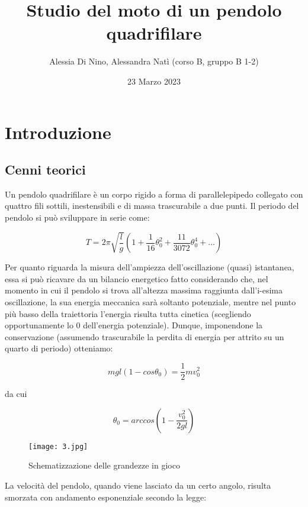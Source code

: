 \documentclass{article}
\begin{document}
\title{Studio del moto di un pendolo quadrifilare}
\author{Alessia Di Nino, Alessandra Natì (corso B, gruppo B 1-2)}
\date{23 Marzo 2023}
\maketitle


\section{Introduzione}
\subsection{Cenni teorici}
Un pendolo quadrifilare è un corpo rigido a forma di parallelepipedo collegato con quattro fili sottili, inestensibili e di massa trascurabile a due punti.
Il periodo del pendolo si può sviluppare in serie come:

\begin{equation}
    T = 2\pi \sqrt{\frac{l}{g}} (1 + \frac{1}{16}\theta_0^2 + \frac{11}{3072}\theta_0^4 + ...)
\end{equation}

Per quanto riguarda la misura dell'ampiezza dell'oscillazione (quasi) istantanea, essa si può ricavare da un bilancio energetico fatto considerando che, nel momento in cui il pendolo si trova all'altezza massima raggiunta dall'i-esima oscillazione, la sua energia meccanica sarà soltanto potenziale, mentre nel punto più basso della traiettoria l'energia risulta tutta cinetica (scegliendo opportunamente lo 0 dell'energia potenziale). Dunque, imponendone la conservazione (assumendo trascurabile la perdita di energia per attrito su un quarto di periodo) otteniamo:

\begin{equation*}
    mgl(1 - cos\theta_0)=\frac{1}{2}mv_0^2
\end{equation*}

da cui

\begin{equation}
    \theta_0 = arccos(1-\frac{v_0^2}{2gl})
    \label{theta}
\end{equation}

\begin{figure}
    \centering
    \texttt{[image: 3.jpg]}
    \caption{Schematizzazione delle grandezze in gioco}
    \label{fig:my_label}
\end{figure}
La velocità del pendolo, quando viene lasciato da un certo angolo, risulta smorzata con andamento esponenziale secondo la legge:
\end{document}
